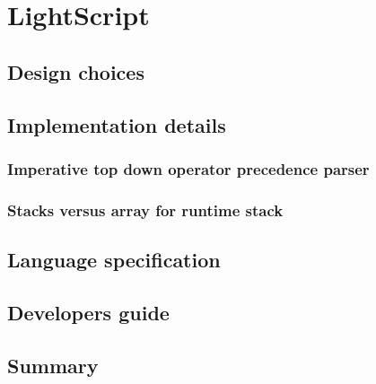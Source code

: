\chapter{LightScript}
\section{Design choices}
\section{Implementation details}
\subsection{Imperative top down operator precedence parser}
\subsection{Stacks versus array for runtime stack}
\section{Language specification}
\section{Developers guide}
\section{Summary}
